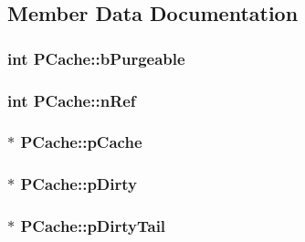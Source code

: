 \subsection{Member Data Documentation}
\hypertarget{struct_p_cache_a6dbb1820ecbfb378841ee81186ea5902}{
\subsubsection[{b\-Purgeable}]{\setlength{\rightskip}{0pt plus 5cm}int P\-Cache\-::b\-Purgeable}}\label{struct_p_cache_a6dbb1820ecbfb378841ee81186ea5902}
\hypertarget{struct_p_cache_a8270710a90112645a69cea03ab5a2d25}{
\subsubsection[{n\-Ref}]{\setlength{\rightskip}{0pt plus 5cm}int P\-Cache\-::n\-Ref}}\label{struct_p_cache_a8270710a90112645a69cea03ab5a2d25}
\hypertarget{struct_p_cache_ad0248655d30d327e0eeced6c3651b161}{
\subsubsection[{p\-Cache}]{$\ast$ P\-Cache\-::p\-Cache}}\label{struct_p_cache_ad0248655d30d327e0eeced6c3651b161}
\hypertarget{struct_p_cache_a1c692ce92c7d3fc7c6c1324d5658b252}{
\subsubsection[{p\-Dirty}]{$\ast$ P\-Cache\-::p\-Dirty}}\label{struct_p_cache_a1c692ce92c7d3fc7c6c1324d5658b252}
\hypertarget{struct_p_cache_a8eaca309bfb8fa49e7c5e77dd3398bb0}{
\subsubsection[{p\-Dirty\-Tail}]{ $\ast$ P\-Cache\-::p\-Dirty\-Tail}}\label{struct_p_cache_a8eaca309bfb8fa49e7c5e77dd3398bb0}
